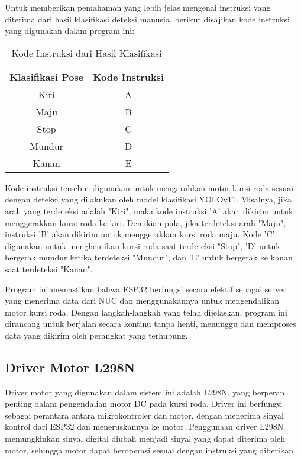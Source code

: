 Untuk memberikan pemahaman yang lebih jelas mengenai instruksi yang diterima dari hasil klasifikasi deteksi manusia, berikut disajikan kode instruksi yang digunakan dalam program ini:
\begin{table}[H]
\centering
\caption{Kode Instruksi dari Hasil Klasifikasi}
\begin{tabular}{|c|c|}
\hline
\textbf{Klasifikasi Pose} & \textbf{Kode Instruksi} \\
\hline
Kiri & A \\
\hline
Maju & B \\
\hline
Stop & C \\
\hline
Mundur & D \\
\hline
Kanan & E \\
\hline
\end{tabular}
\end{table}

Kode instruksi tersebut digunakan untuk mengarahkan motor kursi roda sesuai dengan deteksi yang dilakukan oleh model klasifikasi YOLOv11. Misalnya, jika arah yang terdeteksi adalah "Kiri", maka kode instruksi 'A' akan dikirim untuk menggerakkan kursi roda ke kiri. Demikian pula, jika terdeteksi arah "Maju", instruksi 'B' akan dikirim untuk menggerakkan kursi roda maju. Kode 'C' digunakan untuk menghentikan kursi roda saat terdeteksi "Stop", 'D' untuk bergerak mundur ketika terdeteksi "Mundur", dan 'E' untuk bergerak ke kanan saat terdeteksi "Kanan".

Program ini memastikan bahwa ESP32 berfungsi secara efektif sebagai server yang menerima data dari NUC dan menggunakannya untuk mengendalikan motor kursi roda. Dengan langkah-langkah yang telah dijelaskan, program ini dirancang untuk berjalan secara kontinu tanpa henti, menunggu dan memproses data yang dikirim oleh perangkat yang terhubung.

\subsection{Driver Motor L298N}
\label{subsec:drivermotor}
Driver motor yang digunakan dalam sistem ini adalah L298N, yang berperan penting dalam pengendalian motor DC pada kursi roda. Driver ini berfungsi sebagai perantara antara mikrokontroler dan motor, dengan menerima sinyal kontrol dari ESP32 dan meneruskannya ke motor. Penggunaan driver L298N memungkinkan sinyal digital diubah menjadi sinyal yang dapat diterima oleh motor, sehingga motor dapat beroperasi sesuai dengan instruksi yang diberikan.

